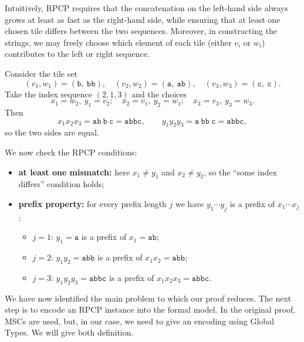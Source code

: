 Intuitively, RPCP requires that the concatenation on the left-hand side always 
grows at least as fast as the right-hand side, while ensuring that at least one 
chosen tile differs between the two sequences. Moreover, in constructing the 
strings, we may freely choose which element of each tile (either $v_i$ or $w_i$) 
contributes to the left or right sequence.

\bigskip

\begin{example}\label{exmp:rpcp}
Consider the tile set
\[
(v_1,w_1)=(\texttt{b},\ \texttt{bb}),\quad
(v_2,w_2)=(\texttt{a},\ \texttt{ab}),\quad
(v_3,w_3)=(\texttt{c},\ \texttt{c}).
\]
Take the index sequence $(2,1,3)$ and the choices
\[
x_1 = w_2,\ y_1 = v_2;\quad
x_2 = v_1,\ y_2 = w_1;\quad
x_3 = v_3,\ y_3 = w_3.
\]
Then
\[
x_1 x_2 x_3 = \texttt{ab}\ \texttt{b}\ \texttt{c} = \texttt{abbc},
\qquad
y_1 y_2 y_3 = \texttt{a}\ \texttt{bb}\ \texttt{c} = \texttt{abbc},
\]
so the two sides are equal.

We now check the RPCP conditions:
\begin{itemize}
  \item \textbf{at least one mismatch:} here $x_1\neq y_1$ and
        $x_2\neq y_2$, so the ``some index differs'' condition holds;
  \item \textbf{prefix property:} for every prefix length $j$ we have
        $y_{1}\cdots y_{j}$ is a prefix of $x_{1}\cdots x_{j}$:
        \begin{itemize}
          \item $j=1$: $y_1=\texttt{a}$ is a prefix of $x_1=\texttt{ab}$;
          \item $j=2$: $y_1y_2=\texttt{abb}$ is a prefix of $x_1x_2=\texttt{abb}$;
          \item $j=3$: $y_1y_2y_3=\texttt{abbc}$ is a prefix of $x_1x_2x_3=\texttt{abbc}$.
        \end{itemize}
\end{itemize}
\end{example}

\bigskip

We have now identified the main problem to which our proof reduces.  
The next step is to encode an RPCP instance into the formal model.
In the original proof, MSCs are used, but, in our case, we need to give
an encoding using Global Types. We will give both definition.

\bigskip

